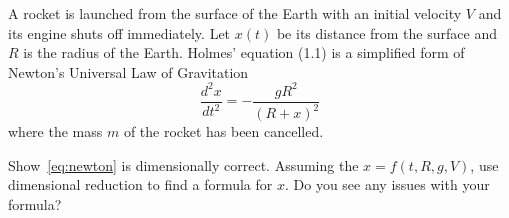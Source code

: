 \documentclass[
	number={2},
	title={Dimensional Analysis}
]{math486homework}
\begin{document}
\begin{problems}
	\problem A rocket is launched from the surface of the Earth with an initial velocity $V$ and its engine shuts off immediately.
	Let $x(t)$ be its distance from the surface and $R$ is the radius of the Earth.
	Holmes' equation (1.1) is a simplified form of Newton's Universal Law of Gravitation
	\begin{equation}
		\frac{d^{2}x}{dt^{2}} = -\frac{gR^{2}}{(R+x)^{2}}
		\label{eq:newton}
	\end{equation}
	where the mass $m$ of the rocket has been cancelled.
	\begin{problems}
		\subproblem Show~\eqref{eq:newton} is dimensionally correct. 
		\subproblem Assuming the $x=f(t, R, g, V)$, use dimensional reduction to find a formula for $x$. 
		\subproblem Do you see any issues with your formula? 
	\end{problems}
\end{problems}
\end{document}
